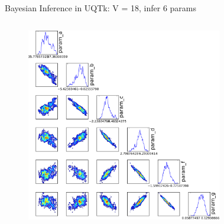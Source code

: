 \documentclass[10pt]{beamer}
\begin{document}
\begin{frame}{Bayesian Inference in UQTk: V = 18, infer 6 params}
	\begin{columns}[c]
			\begin{figure}
	 	 		\includegraphics[width=\textwidth]{v18chain}
	 		\end{figure} 	
	 		\begin{figure}[ht]
	 			\newline

\end{figure}
\end{columns}
\end{frame}
\end{document}
